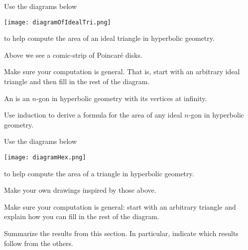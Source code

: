 \documentclass[newpage,hints,12pt,nooutcomes,noauthor]{ximera}
\begin{document}
\begin{problem}
  Use the diagrams below
  \begin{image}
  \texttt{[image: diagramOfIdealTri.png]}
  \end{image}
  to help compute the area of an ideal triangle in hyperbolic geometry.
  \begin{hint}
    Above we see a comic-strip of Poincar\'e disks.
  \end{hint}
  \begin{hint}
    Make sure your computation is general.  That is, start with an arbitrary
    ideal triangle and then fill in the rest of the diagram.
  \end{hint}
\end{problem}


\begin{definition}
  An  is an $n$-gon in hyperbolic
  geometry with its vertices at infinity.
\end{definition}

\begin{problem}
Use induction to derive a formula for the area of any ideal $n$-gon in
hyperbolic geometry.
\end{problem}

\begin{problem}
  Use the diagrams below
  \begin{image}
  \texttt{[image: diagramHex.png]}
  \end{image}
  to help compute the area of a triangle in hyperbolic geometry.
  \begin{hint}
    Make your own drawings inspired by those above.
  \end{hint}
  \begin{hint}
    Make sure your computation is general: start with an arbitrary triangle and
    explain how you can fill in the rest of the diagram.
  \end{hint}
\end{problem}


\begin{problem}
Summarize the results from this section. In particular, indicate which
results follow from the others.
\begin{freeResponse}
\end{freeResponse}
\end{problem}
\end{document}
